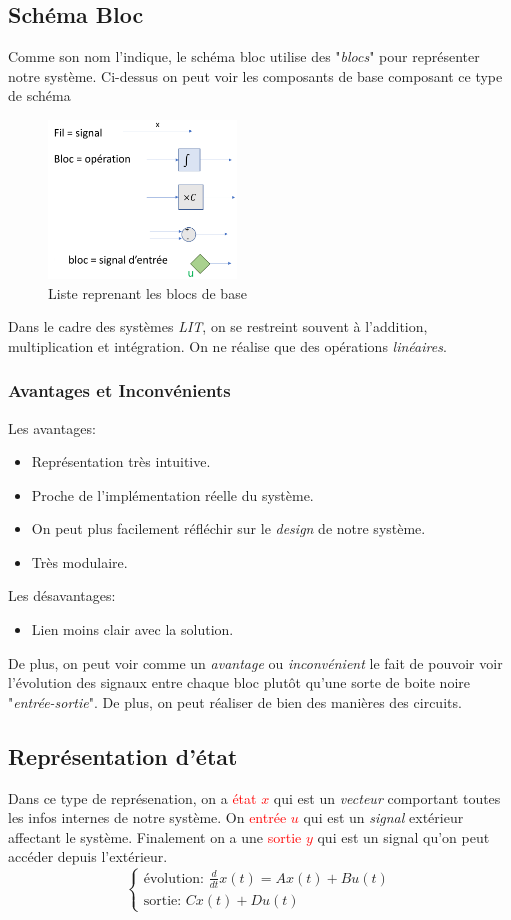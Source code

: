 \documentclass{report}
\begin{document}
\subsection{Schéma Bloc}
Comme son nom l'indique, le schéma bloc utilise des "\textit{blocs}" pour représenter notre système. Ci-dessus on peut voir les composants de base composant ce type de schéma
\begin{figure}[H]
\centering
\includegraphics[width=5cm]{img/blocExemple.png}
\caption{Liste reprenant les blocs de base}
\end{figure}
Dans le cadre des systèmes \textit{LIT}, on se restreint souvent à l'addition, multiplication et intégration. On ne réalise que des opérations \textit{linéaires}.

\subsubsection{Avantages et Inconvénients}
Les avantages:
\begin{itemize}
	\item Représentation très intuitive.
	\item Proche de l'implémentation réelle du système.
	\item On peut plus facilement réfléchir sur le \textit{design} de notre système.
	\item Très modulaire.
\end{itemize}
Les désavantages:
\begin{itemize}
	\item Lien moins clair avec la solution.
\end{itemize}
De plus, on peut voir comme un \textit{avantage} ou \textit{inconvénient} le fait de pouvoir voir l'évolution des signaux entre chaque bloc plutôt qu'une sorte de boite noire "\textit{entrée-sortie}". De plus, on peut réaliser de bien des manières des circuits.

\subsection{Représentation d'état}
Dans ce type de représenation, on a \textcolor{red}{état $x$} qui est un \textit{vecteur} comportant toutes les infos internes de notre système. On \textcolor{red}{entrée $u$} qui est un \textit{signal} extérieur affectant le système. Finalement on a une \textcolor{red}{sortie $y$} qui est un signal qu'on peut accéder depuis l'extérieur.\\
\begin{equation}
\begin{cases}
\text{évolution: }\frac{d}{dt}x(t) =  Ax(t) + Bu(t)\\
\text{sortie: } C x(t) + D u(t)
\end{cases}
\end{equation}
\end{document}
